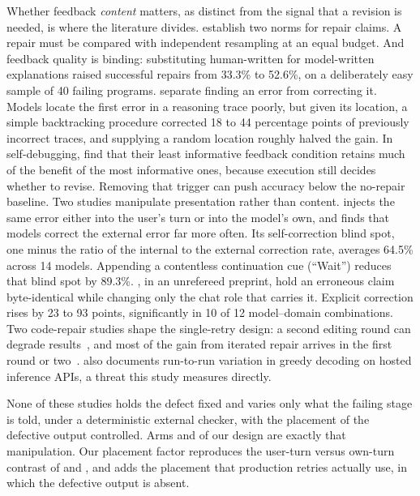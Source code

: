 Whether feedback \emph{content} matters, as distinct from the signal that a
revision is needed, is where the literature divides. \citet{olausson2024selfrepair}
establish two norms for repair claims. A repair must be compared with
independent resampling at an equal budget. And feedback quality is binding:
substituting human-written for model-written explanations raised successful
repairs from 33.3\% to 52.6\%, on a deliberately easy sample of 40 failing
programs. \citet{tyen2024} separate finding an error from correcting it. Models
locate the first error in a reasoning trace poorly, but given its location, a
simple backtracking procedure corrected 18 to 44 percentage points of
previously incorrect traces, and supplying a random location roughly halved
the gain. In self-debugging, \citet{chen2024selfdebug} find that their least
informative feedback condition retains much of the benefit of the most
informative ones, because execution still decides whether to revise. Removing
that trigger can push accuracy below the no-repair baseline. Two studies
manipulate presentation rather than content. \citet{tsui2026scbench} injects the
same error either into the user's turn or into the model's own, and finds that
models correct the external error far more often. Its self-correction blind
spot, one minus the ratio of the internal to the external correction rate,
averages 64.5\% across 14 models. Appending a contentless continuation cue
(``Wait'') reduces that blind spot by 89.3\%. \citet{chen2026rolerelabel}, in
an unrefereed preprint, hold an erroneous claim byte-identical while changing
only the chat role that carries it. Explicit correction rises by 23 to 93
points, significantly in 10 of 12
model--domain combinations. Two code-repair studies shape the single-retry
design: a second editing round can degrade results~\citep{zhang2023selfedit}, and
most of the gain from iterated repair arrives in the first round or
two~\citep{arimbur2026}. \citet{arimbur2026} also documents run-to-run variation
in greedy decoding on hosted inference APIs, a threat this study measures
directly.

None of these studies holds the defect fixed and varies only what the failing
stage is told, under a deterministic external checker, with the placement of
the defective output controlled. Arms  and  of our design are
exactly that manipulation. Our placement factor reproduces the user-turn versus
own-turn contrast of \citet{tsui2026scbench} and \citet{chen2026rolerelabel},
and adds the placement that production retries actually use, in which the
defective output is absent.

